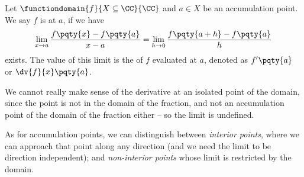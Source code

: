 \begin{definition}[Derivative]
    \label{def:derivative}%
    Let \(\functiondomain{f}{X \subseteq \CC}{\CC}\) and \(a \in X\) be an accumulation point. We say \(f\) is  at \(a\), if we have
    \[
        \lim_{x \to a} \frac{f\pqty{x} - f\pqty{a}}{x - a} = \lim_{h \to 0} \frac{f\pqty{a + h} - f\pqty{a}}{h}
    \]
    exists. The value of this limit is the  of \(f\) evaluated at \(a\), denoted as \(f'\pqty{a}\) or \(\dv{f}{x} \pqty{a}\).
\end{definition}

\begin{remark}
    We cannot really make sense of the derivative at an isolated point of the domain, since the point is not in the domain of the fraction, and not an accumulation point of the domain of the fraction either -- so the limit is undefined.

    As for accumulation points, we can distinguish between \emph{interior points}, where we can approach that point along any direction (and we need the limit to be direction independent); and \emph{non-interior points} whose limit is restricted by the domain.
\end{remark}

